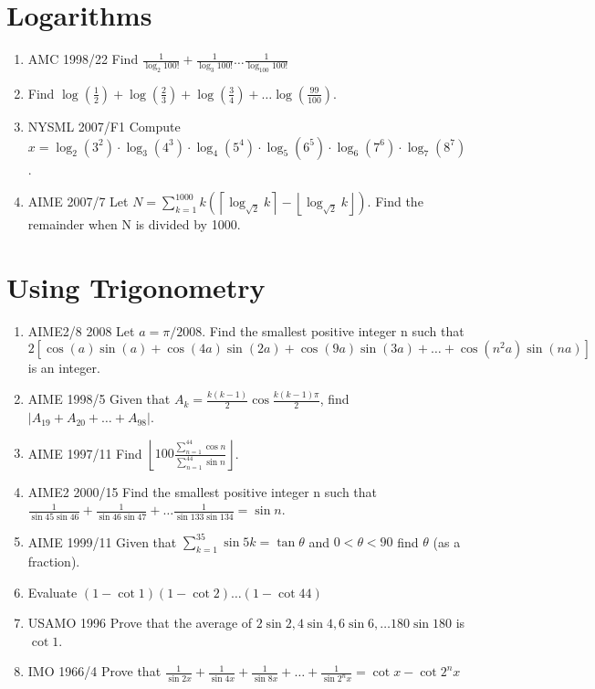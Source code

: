\documentclass{article}
\begin{document}
\section{Logarithms}
\begin{enumerate}
\item AMC 1998/22 Find $\frac{1}{\log_2 100!} + \frac{1}{\log_3 100!} \ldots \frac{1}{\log_{100} 100!}$
\item Find $\log(\frac{1}{2}) + \log(\frac{2}{3}) + \log(\frac{3}{4}) + \ldots \log(\frac{99}{100})$.
\item NYSML 2007/F1 Compute $x = \log_{2} (3^2) \cdot \log_{3} (4^3) \cdot \log_{4} (5^4) \cdot \log_{5} (6^5) \cdot \log_{6} (7^6) \cdot \log_{7} (8^7)$.
\item AIME 2007/7 Let $N= \sum_{k=1}^{1000} k(\left\lceil \log_{\sqrt{2}} k \right\rceil - \left\lfloor \log_{\sqrt{2}} k \right\rfloor)$. Find the remainder when N is divided by 1000.
\end{enumerate}


\section{Using Trigonometry}
\begin{enumerate}

\item AIME2/8 2008 Let $a=\pi/2008$. Find the smallest positive integer n such that $2[\cos(a)\sin(a)+\cos(4a)\sin(2a)+\cos(9a)\sin(3a)+\ldots+\cos(n^2a)\sin(na)]$ is an integer.
\item AIME 1998/5 Given that $A_k = \frac{k(k-1)}{2} \cos \frac{k(k-1)\pi }{2}$, find $\left| A_{19} + A_{20} + \ldots + A_{98}\right|$.
\item AIME 1997/11 Find $\left\lfloor 100 \frac{\sum_{n=1}^{44} \cos n}{\sum_{n=1}^{44} \sin n} \right\rfloor$.
\item AIME2 2000/15 Find the smallest positive integer n such that $\frac{1}{\sin 45 \sin 46} + \frac{1}{\sin 46 \sin 47} + \ldots \frac{1}{\sin 133 \sin 134} = \sin n$.
\item AIME 1999/11 Given that $\sum_{k=1}^{35} \sin 5k = \tan \theta$ and $0 < \theta < 90$ find $\theta$ (as a fraction).
\item Evaluate $(1-\cot 1)(1-\cot 2) \ldots (1-\cot 44)$
\item USAMO 1996 Prove that the average of $2 \sin 2, 4\sin 4, 6\sin 6, \ldots 180 \sin 180$ is $\cot 1$.
\item IMO 1966/4 Prove that $\frac{1}{\sin 2x} + \frac{1}{\sin 4x} + \frac{1}{\sin 8x} + \ldots + \frac{1}{\sin 2^n x}=\cot x -\cot 2^n x$
\end{enumerate}
\end{document}

